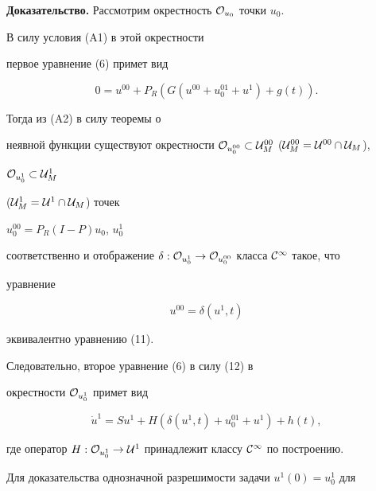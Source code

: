 {\bf Доказательство.} Рассмотрим окрестность ${\cal O}_{u_0}$ точки $u_0$.


В силу условия (A1) в этой окрестности


первое уравнение (6) примет вид


\begin{equation}


0=u^{00}+P_R(G(u^{00}+u_0^{01}+u^1)+g(t)).


\end{equation}


\vskip -1mm %


Тогда из (A2) в силу теоремы о


неявной функции существуют окрестности ${\cal O}_{u_0^{00}} \subset


{\cal U}_M^{00}$ (${\cal U}_M^{00}={\cal U}^{00}\cap {\cal U}_M$),


${\cal O}_{u_0^1} \subset {\cal U}_M^1$


(${\cal U}_M^1={\cal U}^1\cap {\cal U}_M$) точек


$u_0^{00}=P_R(I-P)u_0$, $u_0^1$


соответственно и отображение $\delta : {\cal O}_{u_0^1} \to


{\cal O}_{u_0^{00}}$ класса ${\cal C}^{\infty}$ такое, что


уравнение


\begin{equation}


u^{00}=\delta (u^1,t)


\end{equation}


эквивалентно уравнению (11).





Следовательно, второе уравнение (6) в силу (12) в


окрестности ${\cal O}_{u_0^1}$ примет вид


\begin{equation}


\Dot u^1=Su^1+H(\delta (u^1,t)+u_0^{01}+u^1)+h(t),


\end{equation}


где оператор $H: {\cal O}_{u_0^1} \to


{\cal U}^1$ принадлежит классу ${\cal C}^{\infty}$ по построению.





Для доказательства однозначной разрешимости задачи $u^1(0)=u^1_0$ для


